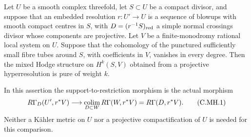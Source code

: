 
\begin{proposition}\label{cdp:st:C.2.MH.1}
Let $U$ be a smooth complex threefold, let $S\subset U$ be a
compact divisor, and suppose that an embedded resolution
$r:U'\to U$ is a sequence of blowups with smooth compact
centres in $S$, with $D=(r^{-1}S)_{\rm red}$ a simple
normal crossings divisor whose components are projective.
Let $V$ be a finite-monodromy rational local system on $U$.
Suppose that the cohomology of the punctured sufficiently
small fibre tubes around $S$, with coefficients in $V$,
vanishes in every degree. Then the mixed Hodge structure
on $H^k(S,V)$ obtained from a projective hyperresolution
is pure of weight $k$.

In this assertion the support-to-restriction morphism is
the actual morphism
\[
 R\Gamma_D(U',r^*V)\longrightarrow
 \underset{D\subset W}{\mathop{\rm colim}}\,
 R\Gamma(W,r^*V)=R\Gamma(D,r^*V).
 \tag{C.MH.1}\label{cdp:eq:C.MH.1}
\]
Neither a K\"ahler metric on $U$ nor a projective
compactification of $U$ is needed for this comparison.
\end{proposition}
